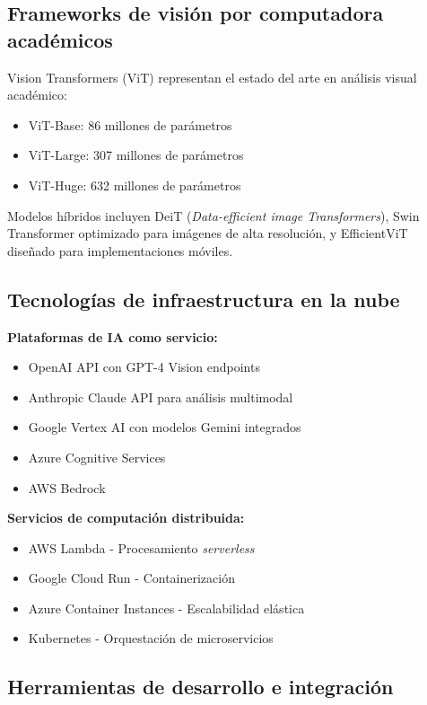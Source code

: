 \subsection{Frameworks de visión por computadora académicos}

Vision Transformers (ViT) representan el estado del arte en análisis visual académico:

\begin{itemize}
    \item ViT-Base: 86 millones de parámetros
    \item ViT-Large: 307 millones de parámetros
    \item ViT-Huge: 632 millones de parámetros
\end{itemize}

Modelos híbridos incluyen DeiT (\textit{Data-efficient image Transformers}), Swin Transformer optimizado para imágenes de alta resolución, y EfficientViT diseñado para implementaciones móviles.

\subsection{Tecnologías de infraestructura en la nube}

\textbf{Plataformas de IA como servicio:}
\begin{itemize}
    \item OpenAI API con GPT-4 Vision endpoints
    \item Anthropic Claude API para análisis multimodal
    \item Google Vertex AI con modelos Gemini integrados
    \item Azure Cognitive Services
    \item AWS Bedrock
\end{itemize}

\textbf{Servicios de computación distribuida:}
\begin{itemize}
    \item AWS Lambda - Procesamiento \textit{serverless}
    \item Google Cloud Run - Containerización
    \item Azure Container Instances - Escalabilidad elástica
    \item Kubernetes - Orquestación de microservicios
\end{itemize}

\subsection{Herramientas de desarrollo e integración}

